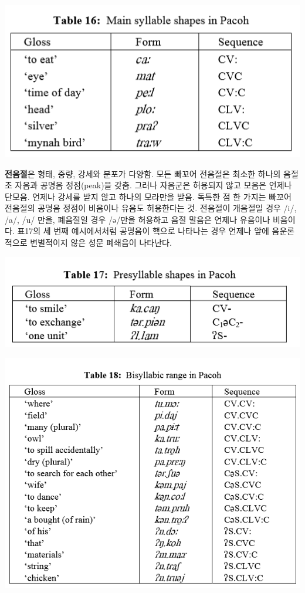 \begin{center}
\includegraphics{Pacoh/src/PacohTable16.png}
\end{center}

\textbf{전음절}은 형태, 중량, 강세와 분포가 다양함. 모든 빠꼬어 전음절은 최소한 하나의 음절초 자음과 공명음 정점(peak)을 갖춤. 그러나 자음군은 허용되지 않고 모음은 언제나 단모음. 언제나 강세를 받지 않고 하나의 모라만을 받음. 독특한 점 한 가지는 빠꼬어 전음절의 공명음 정점이 비음이나 유음도 허용한다는 것. 전음절이 개음절일 경우 /i/, /a/, /u/ 만을, 폐음절일 경우 /ə/만을 허용하고 음절 말음은 언제나 유음이나 비음이다.
표17의 세 번째 예시에서처럼 공명음이 핵으로 나타나는 경우 언제나 앞에 음운론적으로 변별적이지 않은 성문 폐쇄음이 나타난다.

\begin{center}
\includegraphics{Pacoh/src/PacohTable17.png}

\includegraphics{Pacoh/src/PacohTable18.png}
\end{center}

